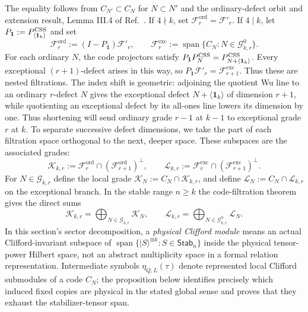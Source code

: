 \documentclass[journal,twocolumn]{IEEEtran}
\theoremstyle{definition}
\theoremstyle{plain}
\newcommand{\Stab}{\mathsf{Stab}}
\newcommand{\Ord}{\mathrm{ord}}
\newcommand{\Exc}{\mathrm{exc}}
\newcommand{\one}{\bm 1}
\newcommand{\cG}{\mathcal G}
\begin{document}
The equality follows from $C_{N'}\subset C_N$ for $N\subset N'$ and the
ordinary-defect orbit and extension result, Lemma III.4 of
Ref.~\cite{MontealegreGross2025}.  If $4\nmid k$, set
$\mathcal F_r^{\Ord}=\mathcal F'_r$.  If $4\mid k$, let
$P_{\one}:=P_{\langle\one_k\rangle}^{\rm CSS}$ and set
\begin{equation}
 \mathcal F_r^{\Ord}:=(I-P_{\one})\mathcal F'_r,
 \qquad
 \mathcal F_r^{\Exc}:=
 \operatorname{span}\{C_N:N\in\cG^0_{k,r}\}.
 \label{eqS:branch-filtrations}
\end{equation}
For each ordinary $N$, the code projectors satisfy
$P_{\one}P_N^{\rm CSS}=P_{N+\langle\one_k\rangle}^{\rm CSS}$.
Every exceptional $(r+1)$-defect arises in this way, so
$P_{\one}\mathcal F'_r=\mathcal F_{r+1}^{\Exc}$.  Thus these are nested
filtrations.  The index shift is geometric: adjoining the quotient Wu line
to an ordinary $r$-defect $N$ gives the exceptional defect
$N+\langle\one_k\rangle$ of dimension $r+1$, while quotienting an
exceptional defect by its all-ones line lowers its dimension by one.  Thus
shortening will send ordinary grade $r-1$ at $k-1$ to exceptional grade $r$
at $k$.  To separate successive defect dimensions, we take the part of
each filtration space orthogonal to the next, deeper space.  These
subspaces are the associated grades:
\begin{equation}
 \mathcal K_{k,r}:=
 \mathcal F_r^{\Ord}\cap(\mathcal F_{r+1}^{\Ord})^\perp,
 \qquad
 \mathcal L_{k,r}:=
 \mathcal F_r^{\Exc}\cap(\mathcal F_{r+1}^{\Exc})^\perp.
 \label{eqS:associated-grade}
\end{equation}
For $N\in\cG_{k,r}$ define the local grade
$\mathcal K_N:=C_N\cap\mathcal K_{k,r}$, and define
$\mathcal L_N:=C_N\cap\mathcal L_{k,r}$ on the exceptional branch.  In the
stable range $n\geq k$ the code-filtration theorem gives the direct sums
\begin{equation}
 \mathcal K_{k,r}=\bigoplus_{N\in\cG_{k,r}}\mathcal K_N,
 \qquad
 \mathcal L_{k,r}=\bigoplus_{N\in\cG^0_{k,r}}\mathcal L_N.
 \label{eqS:local-grades}
\end{equation}
In this section's sector decomposition, a \emph{physical Clifford module}
means an actual Clifford-invariant subspace of
$\operatorname{span}\{|S\rangle^{\otimes k}:S\in\Stab_n\}$ inside the
physical tensor-power Hilbert space, not an abstract multiplicity space in a
formal relation representation.  Intermediate symbols $\eta_{Q,L}(\tau)$
denote represented local Clifford submodules of a code $C_N$; the proposition
below identifies precisely which induced fixed copies are physical in the
stated global sense and proves that they exhaust the stabilizer-tensor span.
\end{document}
